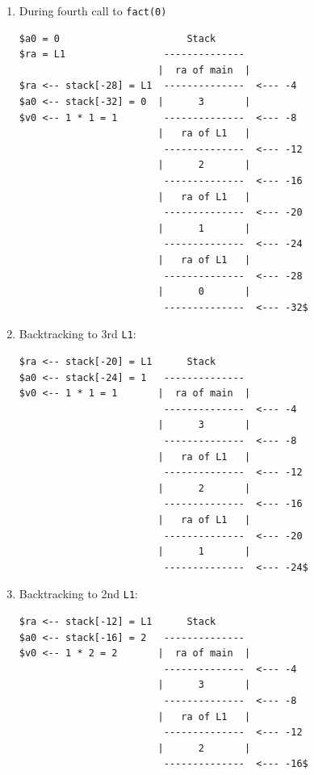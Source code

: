 \documentclass[10pt]{article}
\begin{document}
\begin{enumerate}
\item During fourth call to \texttt{fact(0)} 
\begin{lstlisting}[style=CStyle, xleftmargin=5.0ex, aboveskip=1em, belowskip=1em, escapeinside=..]
$a0 = 0                      Stack
$ra = L1                 --------------
                        |  ra of main  |
$ra <-- stack[-28] = L1  --------------  <--- -4
$a0 <-- stack[-32] = 0  |      3       |
$v0 <-- 1 * 1 = 1        --------------  <--- -8
                        |   ra of L1   |
                         --------------  <--- -12
                        |      2       |
                         --------------  <--- -16
                        |   ra of L1   |
                         --------------  <--- -20
                        |      1       |
                         --------------  <--- -24
                        |   ra of L1   |
                         --------------  <--- -28
                        |      0       |
                         --------------  <--- -32$
\end{lstlisting}
\pagebreak
\item Backtracking to 3rd \texttt{L1}: 
\begin{lstlisting}[style=CStyle, xleftmargin=5.0ex, aboveskip=1em, belowskip=1em, escapeinside=..]
$ra <-- stack[-20] = L1      Stack
$a0 <-- stack[-24] = 1   --------------
$v0 <-- 1 * 1 = 1       |  ra of main  |
                         --------------  <--- -4
                        |      3       |
                         --------------  <--- -8
                        |   ra of L1   |
                         --------------  <--- -12
                        |      2       |
                         --------------  <--- -16
                        |   ra of L1   |
                         --------------  <--- -20
                        |      1       |
                         --------------  <--- -24$
\end{lstlisting}

  \item Backtracking to 2nd \texttt{L1}: 
\begin{lstlisting}[style=CStyle, xleftmargin=5.0ex, aboveskip=1em, belowskip=1em, escapeinside=..]
$ra <-- stack[-12] = L1      Stack
$a0 <-- stack[-16] = 2   --------------
$v0 <-- 1 * 2 = 2       |  ra of main  |
                         --------------  <--- -4
                        |      3       |
                         --------------  <--- -8
                        |   ra of L1   |
                         --------------  <--- -12
                        |      2       |
                         --------------  <--- -16$
\end{lstlisting}


\end{enumerate}
\end{document}
